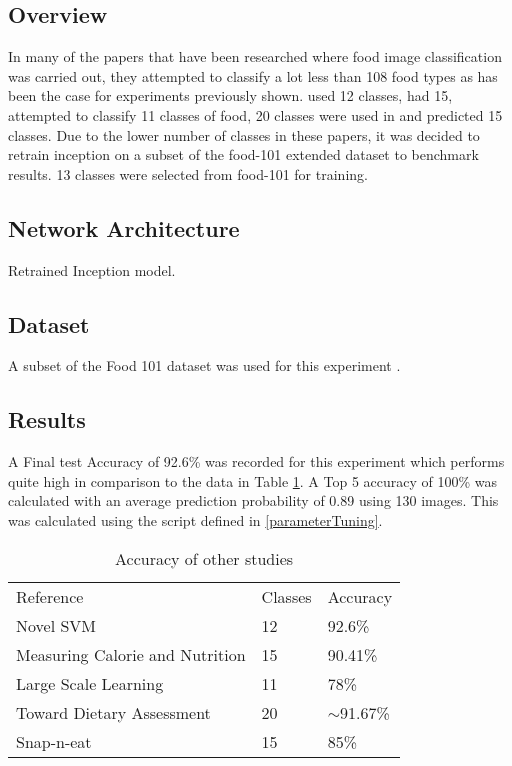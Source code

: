 \subsection*{Overview}
In many of the papers that have been researched where food image classification was carried out, they attempted to classify a lot less than 108 food types as has been the case for experiments previously shown.
\parencite{novelSVM} used 12 classes, \parencite{pouladzadeh2014measuring} had 15, \parencite{LSL_2015} attempted to classify 11 classes of food, 20 classes were used in \parencite{chen2010toward} and \parencite{snap} predicted 15 classes.
Due to the lower number of classes in these papers, it was decided to retrain inception on a subset of the food-101 extended dataset to benchmark results.
13 classes were selected from food-101 for training.

\subsection*{Network Architecture}
Retrained Inception model.

\subsection*{Dataset}
A subset of the Food 101 dataset was used for this experiment \parencite{food101}.

\subsection*{Results}
A Final test Accuracy of 92.6\% was recorded for this experiment which performs quite high in comparison to the data in Table \ref{classes_accuracy}.
A Top 5 accuracy of 100\% was calculated with an average prediction probability of 0.89 using 130 images.
This was calculated using the script defined in \ref{parameterTuning}.

\begin{table}[]
\centering
\caption{Accuracy of other studies}
\label{classes_accuracy}
\begin{tabular}{lll}
Reference                       & Classes & Accuracy      \\
Novel SVM                       & 12      & 92.6\%        \\
Measuring Calorie and Nutrition & 15      & 90.41\%       \\
Large Scale Learning            & 11      & 78\%          \\
Toward Dietary Assessment       & 20      & $\sim$91.67\% \\
Snap-n-eat                      & 15      & 85\%         
\end{tabular}
\end{table}

